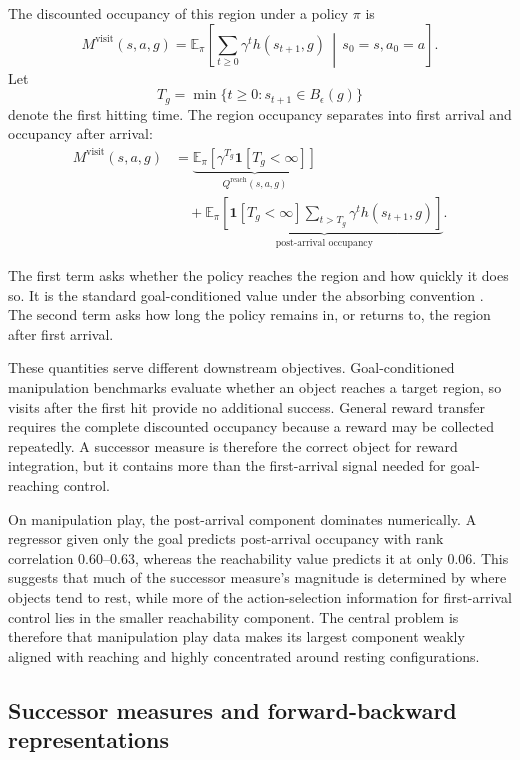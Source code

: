 \documentclass{article}
\newcommand{\E}{\mathbb{E}}
\newcommand{\ind}[1]{\mathbf{1}\!\left[#1\right]}
\newcommand{\Reach}{\mathrm{reach}}
\newcommand{\Visit}{\mathrm{visit}}
\begin{document}
The discounted occupancy of this region under a policy $\pi$ is
\begin{equation}
M^{\Visit}(s,a,g)
=
\E_\pi\!\left[
\sum_{t\ge0}\gamma^t h(s_{t+1},g)
\,\middle|\,
s_0=s,a_0=a
\right].
\label{eq:region-occupancy}
\end{equation}
Let
\begin{equation}
T_g=\min\{t\ge0:s_{t+1}\in B_\epsilon(g)\}
\end{equation}
denote the first hitting time.
The region occupancy separates into first arrival and occupancy after arrival:
\begin{align}
M^{\Visit}(s,a,g)
&=
\underbrace{
\E_\pi\!\left[\gamma^{T_g}\ind{T_g<\infty}\right]
}_{Q^{\Reach}(s,a,g)}
\nonumber\\
&\quad+
\underbrace{
\E_\pi\!\left[
\ind{T_g<\infty}
\sum_{t>T_g}\gamma^t h(s_{t+1},g)
\right]
}_{\text{post-arrival occupancy}}.
\label{eq:occupancy-decomposition}
\end{align}

The first term asks whether the policy reaches the region and how quickly it does so.
It is the standard goal-conditioned value under the absorbing convention \citep{kaelbling1993learning,andrychowicz2017hindsight}.
The second term asks how long the policy remains in, or returns to, the region after first arrival.

These quantities serve different downstream objectives.
Goal-conditioned manipulation benchmarks evaluate whether an object reaches a target region, so visits after the first hit provide no additional success.
General reward transfer requires the complete discounted occupancy because a reward may be collected repeatedly.
A successor measure is therefore the correct object for reward integration, but it contains more than the first-arrival signal needed for goal-reaching control.

On manipulation play, the post-arrival component dominates numerically.
A regressor given only the goal predicts post-arrival occupancy with rank correlation $0.60$--$0.63$, whereas the reachability value predicts it at only $0.06$.
This suggests that much of the successor measure's magnitude is determined by where objects tend to rest, while more of the action-selection information for first-arrival control lies in the smaller reachability component.
The central problem is therefore that manipulation play data makes its largest component weakly aligned with reaching and highly concentrated around resting configurations.

\subsection{Successor measures and forward-backward representations}
\label{sec:prelim}
\end{document}
